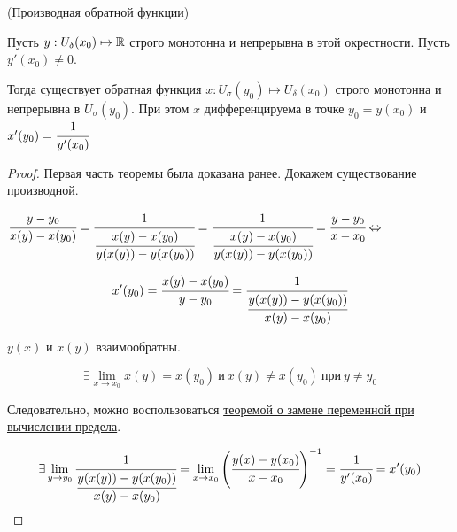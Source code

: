 \begin{theorem}
    \hypertarget{5.11}{(Производная обратной функции)} Пусть $y: U_{\delta}(x_{0}) \mapsto \mathbb{R}$ строго монотонна и непрерывна в этой окрестности. Пусть $y'(x_{0}) \neq 0$.

    Тогда существует обратная функция $x: U_{\sigma}(y_{0}) \mapsto U_{\delta}(x_{0})$ строго монотонна и непрерывна в $U_{\sigma}(y_{0})$. При этом $x$ дифференцируема в точке $y_{0} = y(x_{0})$ и $x'(y_{0}) = \cfrac{1}{y'(x_{0})}$ 
\end{theorem}
\begin{proof}
    Первая часть теоремы была доказана ранее. Докажем существование производной.

    $\cfrac{y - y_{0}}{x(y) - x(y_{0})} = \cfrac{1}{\cfrac{x(y) - x(y_{0})}{y(x(y)) - y(x(y_{0}))}} = \cfrac{1}{\cfrac{x(y) - x(y_{0})}{y(x(y)) - y(x(y_{0}))}} = \cfrac{y-y_{0}}{x-x_{0}} \Leftrightarrow $

    $$
    x'(y_{0}) = \cfrac{x(y) - x(y_{0})}{y - y_{0}} = \cfrac{1}{\cfrac{y(x(y)) - y(x(y_{0}))}{x(y) - x(y_{0})}}
    $$
    
    $y(x)$ и $x(y)$ взаимообратны. 

    $$\exists \lim\limits_{x \to x_{0}} x(y) = x(y_{0})\  \textrm{и} \ x(y) \neq x(y_{0}) \ \textrm{при} \ y\neq y_{0}$$

    Следовательно, можно воспользоваться \hyperlink{thrm4.17}{теоремой о замене переменной при вычислении предела}.

    $$\exists \lim\limits_{y \to y_{0}} \cfrac{1}{\cfrac{y(x(y)) - y(x(y_{0}))}{x(y) - x(y_{0})}} = \lim\limits_{x \to x_{0}} \left( \cfrac{y(x) - y(x_{0})}{x - x_{0}}\right)^{-1} = \cfrac{1}{y'(x_{0})} = x'(y_{0})$$    
\end{proof}
